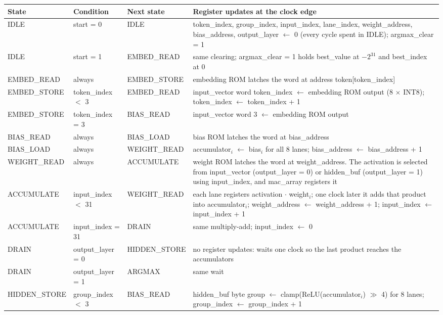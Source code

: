 \documentclass[10pt,a4paper]{article}
\begin{document}
\footnotesize
\begin{longtable}{@{}>{\ttfamily}p{2.3cm} >{\ttfamily}p{2.9cm} >{\ttfamily}p{2.3cm} p{8.3cm}@{}}
\toprule
\textbf{State} & \textbf{Condition} & \textbf{Next state} & \textbf{Register updates at the clock edge} \\
\midrule
\endhead
IDLE & start = 0 & IDLE & token_index, group_index, input_index, lane_index, weight_address, bias_address, output_layer $\leftarrow$ 0 (every cycle spent in IDLE); argmax_clear = 1 \\
IDLE & start = 1 & EMBED_READ & same clearing; argmax_clear = 1 holds best_value at $-2^{31}$ and best_index at 0 \\
\midrule
EMBED_READ & always & EMBED_STORE & embedding ROM latches the word at address token[token_index] \\
EMBED_STORE & token_index $<$ 3 & EMBED_READ & input_vector word token_index $\leftarrow$ embedding ROM output (8 $\times$ INT8); token_index $\leftarrow$ token_index + 1 \\
EMBED_STORE & token_index = 3 & BIAS_READ & input_vector word 3 $\leftarrow$ embedding ROM output \\
\midrule
BIAS_READ & always & BIAS_LOAD & bias ROM latches the word at bias_address \\
BIAS_LOAD & always & WEIGHT_READ & accumulator$_i$ $\leftarrow$ bias$_i$ for all 8 lanes; bias_address $\leftarrow$ bias_address + 1 \\
\midrule
WEIGHT_READ & always & ACCUMULATE & weight ROM latches the word at weight_address. The activation is selected from input_vector (output_layer = 0) or hidden_buf (output_layer = 1) using input_index, and mac_array registers it \\
ACCUMULATE & input_index $<$ 31 & WEIGHT_READ & each lane registers activation $\cdot$ weight$_i$; one clock later it adds that product into accumulator$_i$; weight_address $\leftarrow$ weight_address + 1; input_index $\leftarrow$ input_index + 1 \\
ACCUMULATE & input_index = 31 & DRAIN & same multiply-add; input_index $\leftarrow$ 0 \\
DRAIN & output_layer = 0 & HIDDEN_STORE & no register updates: waits one clock so the last product reaches the accumulators \\
DRAIN & output_layer = 1 & ARGMAX & same wait \\
\midrule
HIDDEN_STORE & group_index $<$ 3 & BIAS_READ & hidden_buf byte group $\leftarrow$ clamp(ReLU(accumulator$_i$) $\gg$ 4) for 8 lanes; group_index $\leftarrow$ group_index + 1 \\

\end{longtable}
\end{document}
